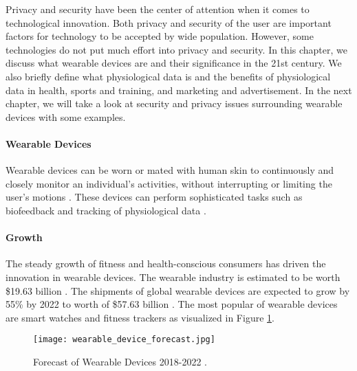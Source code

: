 \label{chapter:introduction}
Privacy and security have been the center of attention when it comes to technological innovation. Both privacy and security of the user are important factors for technology to be accepted by wide population. However, some technologies do not put much effort into privacy and security. In this chapter, we discuss what wearable devices are and their significance in the 21st century. We also briefly define what physiological data is and the benefits of physiological data in health, sports and training, and marketing and advertisement. In the next chapter, we will take a look at security and privacy issues surrounding wearable devices with some examples. 

\paragraph{Wearable Devices}
Wearable devices can be worn or mated with human skin to continuously and closely monitor an individual’s activities, without interrupting or limiting the user’s motions \cite{gao_fully_2016}. These devices can perform sophisticated tasks such as biofeedback and tracking of physiological data \cite{noauthor_wearable_nodate}.

\paragraph{Growth} The steady growth of fitness and health-conscious consumers has driven the innovation in wearable devices. The wearable industry is estimated to be worth \$19.63 billion \cite{noauthor_wearable_market_nodate}. The shipments of global wearable devices are expected to grow by 55\% by 2022 \cite{WearableStudy} to worth of \$57.63 billion \cite{noauthor_wearable_market_nodate}. The most popular of wearable devices are smart watches and fitness trackers as visualized in Figure \ref{fig:forecast_of_wearable_devices}.

\begin{figure}
    \centering
    \texttt{[image: wearable\_device\_forecast.jpg]}
    \caption{Forecast of Wearable Devices 2018-2022 \cite{WearableStudy}.}
    \label{fig:forecast_of_wearable_devices}
\end{figure}


